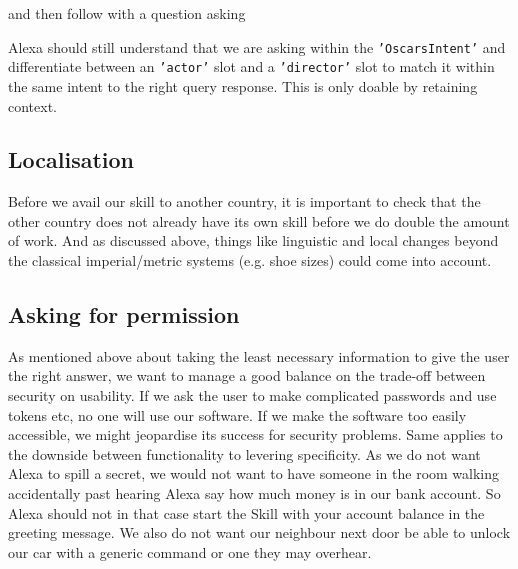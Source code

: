 \begin{flushright}
\end{flushright}
\noindent and then follow with a question asking




\noindent Alexa should still understand that we are asking within the \texttt{'OscarsIntent'} and differentiate between an \texttt{'actor'} slot and a \texttt{'director'} slot to match it within the same intent to the right query response.
This is only doable by retaining context.


\subsection*{Localisation}
Before we avail our skill to another country, it is important to check that the other country does not already have its own skill before we do double the amount of work. And as discussed above, things like linguistic and local changes beyond the classical imperial/metric systems (e.g. shoe sizes) could come into account.

\subsection*{Asking for permission}
As mentioned above about taking the least necessary information to give the user the right answer, we want to manage a good balance on the trade-off between security on usability. If we ask the user to make complicated passwords and use tokens etc, no one will use our software. If we make the software too easily accessible, we might jeopardise its success for security problems. Same applies to the downside between functionality to levering specificity. As we do not want Alexa to spill a secret, we would not want to have someone in the room walking accidentally past hearing Alexa say how much money is in our bank account. So Alexa should not in that case start the Skill with your account balance in the greeting message. We also do not want our neighbour next door be able to unlock our car with a generic command or one they may overhear.

